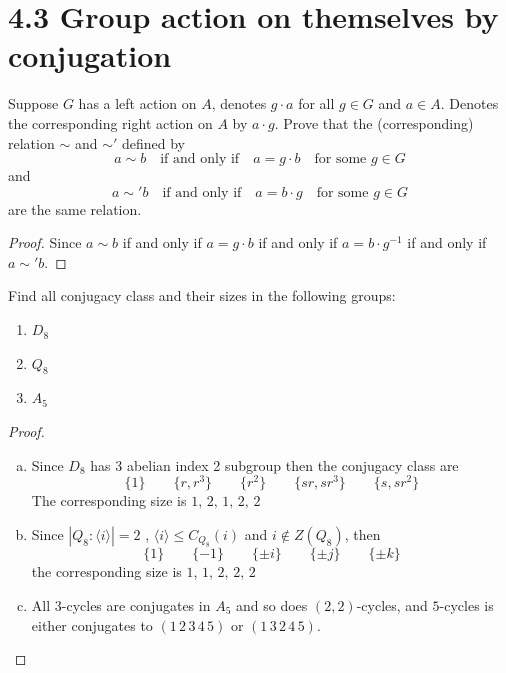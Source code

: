 \documentclass{article}
\newenvironment{problem}[2][Problem]{\begin{trivlist}
\item[\hskip \labelsep {\bfseries #1}\hskip \labelsep {\bfseries #2.}]}{\end{trivlist}}
\begin{document}
\section*{4.3 Group action on themselves by conjugation}
\begin{problem}{1}
    Suppose $G$ has a left action on $A$, denotes $g\cdot a$ for all $g \in G$ and $a \in A$. Denotes the corresponding right action on $A$ by $a \cdot g$. Prove that the (corresponding) relation $\sim$ and $\sim'$ defined by 
    \[
    a \sim b \quad\text{if and only if}\quad a =g \cdot b \quad\text{for some } g \in G
    \]
    and 
    \[
    a \sim ' b \quad \text{if and only if}\quad a = b\cdot g\quad\text{for some } g \in G
    \]
    are the same relation.
\end{problem}
\begin{proof}
    Since $a \sim b $ if and only if $ a= g \cdot b$ if and only if $a =b \cdot g^{-1}$ if and only if $a \sim ' b$.
\end{proof}
\begin{problem}{2}
    Find all conjugacy class and their sizes in the following groups:
    \begin{enumerate}
        \item[(a)]  $D_8$ \hspace{5pt}\item[(b)] $Q_8 $\hspace{5pt} \item[(c)] $A_5$ 
    \end{enumerate}
    
\end{problem}
\begin{proof}
    \begin{enumerate}[(a)]
        \item Since $D_8$ has 3 abelian index 2 subgroup then the conjugacy class are
        \[
        \{1\}\qquad \{r, r^3\} \qquad \{r^2\} \qquad \{sr, sr^3\} \qquad \{s, sr^2\} 
        \]
        The corresponding size is $1, \, 2, \, 1, \, 2, \, 2$
        \item Since $|Q_8:\langle i \rangle|=2$ , $\langle i \rangle \leq C_{Q_8}(i)$ and $i \notin Z(Q_8)$, then 
        \[
            \{1\} \qquad \{-1\} \qquad \{\pm i\}\qquad \{\pm j\} \qquad \{\pm k\}
        \]
        the corresponding size is $1, \, 1, \, 2, \, 2, \, 2$
        \item 
        All $3$-cycles are conjugates in $A_5$ and so does $(2, 2)$-cycles, and $5$-cycles is either conjugates to $(1\, 2\, 3\, 4\, 5)$ or $(1\, 3\, 2\, 4\, 5)$.
    \end{enumerate}
\end{proof}
\end{document}
